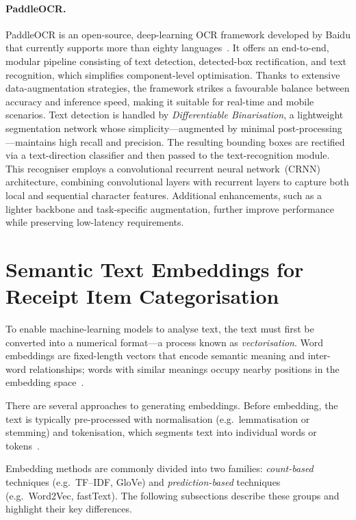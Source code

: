 \documentclass{SGGW-thesis-EN}
\begin{document}
\paragraph{PaddleOCR.}
PaddleOCR is an open-source, deep-learning OCR framework developed by Baidu that currently
supports more than eighty languages~\cite{du2020ppocr,du2020ppocr-web}.
It offers an end-to-end, modular pipeline consisting of text detection, detected-box
rectification, and text recognition, which simplifies component-level optimisation.
Thanks to extensive data-augmentation strategies, the framework strikes a favourable
balance between accuracy and inference speed, making it suitable for real-time and
mobile scenarios.
Text detection is handled by \textit{Differentiable Binarisation}, a lightweight
segmentation network whose simplicity—augmented by minimal post-processing—maintains
high recall and precision.
The resulting bounding boxes are rectified via a text-direction classifier and then
passed to the text-recognition module.
This recogniser employs a convolutional recurrent neural network~(CRNN) architecture,
combining convolutional layers with recurrent layers to capture both local and
sequential character features.
Additional enhancements, such as a lighter backbone and task-specific augmentation,
further improve performance while preserving low-latency requirements.

\section{Semantic Text Embeddings for Receipt Item Categorisation}
To enable machine-learning models to analyse text, the text must first be converted into a numerical
format—a process known as \emph{vectorisation}.
Word embeddings are fixed-length vectors that encode semantic meaning and inter-word relationships;
words with similar meanings occupy nearby positions in the embedding space~\cite{almeida2023wordembeddingssurvey}.

There are several approaches to generating embeddings.
Before embedding, the text is typically pre-processed with normalisation (e.g.\ lemmatisation or stemming)
and tokenisation, which segments text into individual words or tokens~\cite{jurafsky2023slp3}.

Embedding methods are commonly divided into two families:
\emph{count-based} techniques (e.g.\ TF–IDF, GloVe) and \emph{prediction-based} techniques (e.g.\ Word2Vec,
fastText).
The following subsections describe these groups and highlight their key differences.
\end{document}
